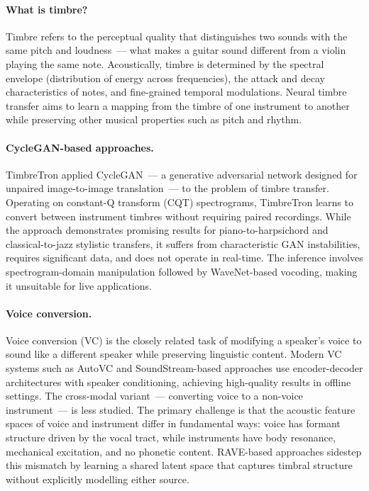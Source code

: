 \paragraph{What is timbre?}
Timbre refers to the perceptual quality that distinguishes two sounds with the same pitch and loudness~--- what makes a guitar sound different from a violin playing the same note. Acoustically, timbre is determined by the spectral envelope (distribution of energy across frequencies), the attack and decay characteristics of notes, and fine-grained temporal modulations. Neural timbre transfer aims to learn a mapping from the timbre of one instrument to another while preserving other musical properties such as pitch and rhythm.

\paragraph{CycleGAN-based approaches.}
TimbreTron \cite{huang2018timbretron} applied CycleGAN~--- a generative adversarial network designed for unpaired image-to-image translation~--- to the problem of timbre transfer. Operating on constant-Q transform (CQT) spectrograms, TimbreTron learns to convert between instrument timbres without requiring paired recordings. While the approach demonstrates promising results for piano-to-harpsichord and classical-to-jazz stylistic transfers, it suffers from characteristic GAN instabilities, requires significant data, and does not operate in real-time. The inference involves spectrogram-domain manipulation followed by WaveNet-based vocoding, making it unsuitable for live applications.

\paragraph{Voice conversion.}
Voice conversion (VC) is the closely related task of modifying a speaker's voice to sound like a different speaker while preserving linguistic content. Modern VC systems such as AutoVC \cite{qian2019autovc} and SoundStream-based approaches use encoder-decoder architectures with speaker conditioning, achieving high-quality results in offline settings. The cross-modal variant~--- converting voice to a non-voice instrument~--- is less studied. The primary challenge is that the acoustic feature spaces of voice and instrument differ in fundamental ways: voice has formant structure driven by the vocal tract, while instruments have body resonance, mechanical excitation, and no phonetic content. RAVE-based approaches sidestep this mismatch by learning a shared latent space that captures timbral structure without explicitly modelling either source.

